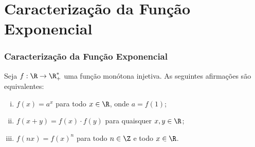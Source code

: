 \section{Caracterização da Função Exponencial}
\begin{frame}
\frametitle{Caracterização da Função Exponencial} 

\begin{teorema}
Seja $f: \R \to \R_+^\ast$ uma função monótona injetiva. As
seguintes afirmações são equivalentes:
\begin{enumerate}[(i)]
	\item $f(x) = a^x$ para todo $x\in \R$, onde $a = f(1)$;
	\item $f(x+y) = f(x)\cdot f(y)$ para quaisquer $x, y \in \R$;
	\item $f(nx) = f(x)^n$ para todo $n \in \Z$ e todo $x \in \R$.
\end{enumerate}
\end{teorema}



\end{frame}
